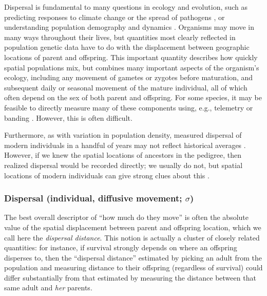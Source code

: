 \documentclass{ar-1col}
\begin{document}
Dispersal is fundamental to many questions in ecology and evolution,
such as
predicting responses to climate change \citep{parmesan2006}
or the spread of pathogens \citep{BiekReal2010},
or understanding population demography and dynamics \citep{schreiber2010interactive}.
Organisms may move in many ways throughout their lives,
but quantities most clearly reflected in population genetic data
have to do with the displacement between geographic locations of parent and offspring.
This important quantity describes how quickly spatial populations mix,
but combines many important aspects of the organism's ecology, including
any movement of gametes or zygotes before maturation,
and subsequent daily or seasonal movement of the mature individual,
all of which often depend on the sex of both parent and offspring.
For some species,
it may be feasible to directly measure many of these components
using, e.g., telemetry or banding \citep{dispersal_estimation}.
However, this is often difficult.

Furthermore, as with variation in population density,
measured dispersal of modern individuals in a handful of years
may not reflect historical averages \citep{WhitlockMcCauley1999}.
However, 
if we knew the spatial locations of ancestors in the pedigree,
then realized dispersal would be recorded directly;
we usually do not, but spatial locations of modern individuals
can give strong clues about this \citep{Cayuela2018demographic}.


\subsubsection{Dispersal (individual, diffusive movement; $\sigma$)}

The best overall descriptor of ``how much do they move''
is often the absolute value of the spatial displacement between parent and offspring location,
which we call here the \textit{dispersal distance}.
This notion is actually a cluster of closely related quantities:
for instance, if survival strongly depends on where an offspring disperses to,
then the ``dispersal distance'' estimated by picking an adult from the population
and measuring distance to their offspring (regardless of survival)
could differ substantially from that estimated by measuring the distance between that same adult
and \textit{her} parents.
\end{document}
